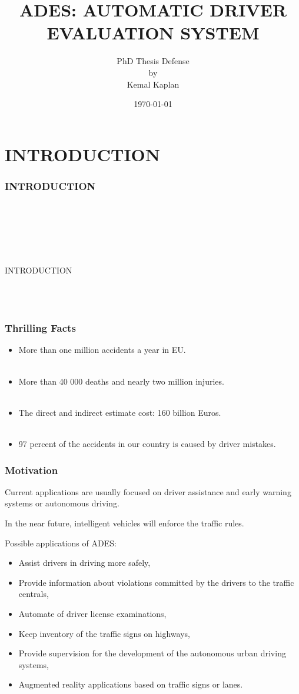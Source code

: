 \documentclass{beamer}
\title{ADES: AUTOMATIC DRIVER EVALUATION SYSTEM}
\author{PhD Thesis Defense \\ by \\ Kemal Kaplan}
\date{\today}
\newcommand{\mysectionpage}[2]{
	\begin{frame}
		\frametitle{#1}
		~\\~
		\begin{block}{}
			~\\~
			\begin{center}
				#2
			\end{center}
			~\\~
		\end{block}
	\end{frame}
}
\begin{document}
\frame{\titlepage}


\section{INTRODUCTION}
\mysectionpage{INTRODUCTION}{INTRODUCTION}

\frame
{
  \frametitle{Thrilling Facts}
  \begin{itemize}
  \item More than one million accidents a year in EU. \\ ~
  \item More than 40 000 deaths and nearly two million injuries. \\  ~
  \item The direct and indirect estimate cost: 160 billion Euros.\\  ~
  \item 97 percent of the accidents in our country is caused by driver mistakes.
  \end{itemize}
}

\frame
{
  \frametitle{Motivation}
  Current applications are usually focused on driver assistance and early warning systems or autonomous driving.
  \begin{block}{}In the near future, intelligent vehicles will enforce the traffic rules.\end{block}
  Possible applications of ADES:
  {\scriptsize
	\begin{itemize}
		\item Assist drivers in driving more safely,
		\item Provide information about violations committed by the drivers to the traffic centrals,
		\item Automate of driver license examinations,
		\item Keep inventory of the traffic signs on highways,
		\item Provide supervision for the development of the autonomous urban driving systems,
		\item	Augmented reality applications based on traffic signs or lanes.
	\end{itemize}
	}
}
\end{document}
